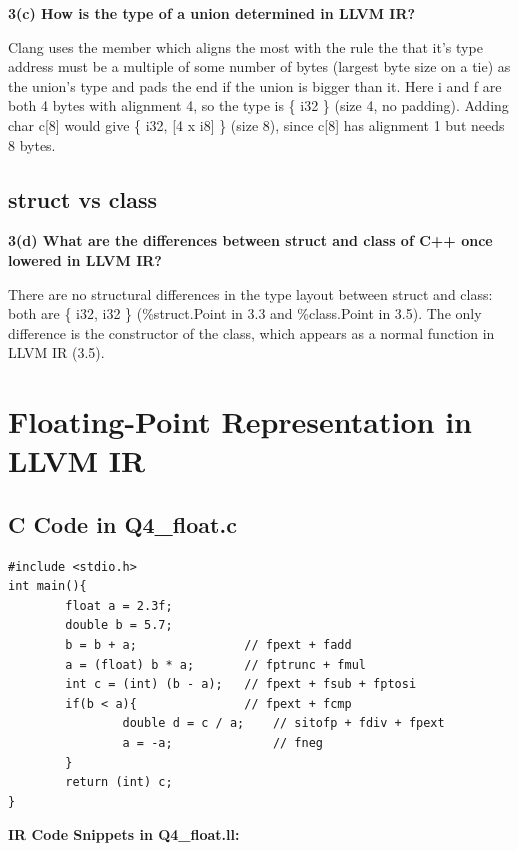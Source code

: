 \documentclass[11pt,a4paper]{article}
\begin{document}
\textbf{3(c) How is the type of a union determined in LLVM IR?}

Clang uses the member which aligns the most with the rule the that it's type address must be a multiple of some number of bytes (largest byte size on a tie) as the union's type and pads the end if the union is bigger than it. Here i and f are both 4 bytes with alignment 4, so the type is \{ i32 \} (size 4, no padding). Adding char c[8] would give \{ i32, [4 x i8] \} (size 8), since c[8] has alignment 1 but needs 8 bytes.

\subsection{struct vs class}

\textbf{3(d) What are the differences between struct and class of C++ once lowered in LLVM IR?}

There are no structural differences in the type layout between struct and class: both are \{ i32, i32 \} (\%struct.Point in 3.3 and \%class.Point in 3.5). The only difference is the constructor of the class, which appears as a normal function in LLVM IR (3.5).

\clearpage
\section{Floating-Point Representation in LLVM IR}

\subsection{C Code in Q4\_float.c}

\begin{lstlisting}
#include <stdio.h>
int main(){
        float a = 2.3f;
        double b = 5.7;
        b = b + a;               // fpext + fadd
        a = (float) b * a;       // fptrunc + fmul
        int c = (int) (b - a);   // fpext + fsub + fptosi
        if(b < a){               // fpext + fcmp
                double d = c / a;    // sitofp + fdiv + fpext
                a = -a;              // fneg
        }
        return (int) c;
}
\end{lstlisting}

\medskip\noindent\textbf{IR Code Snippets in Q4\_float.ll:}\par
\end{document}
